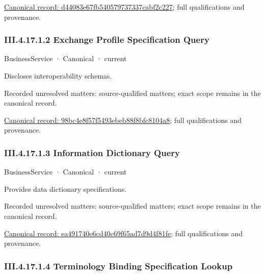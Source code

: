 {\footnotesize \href{../../../../../../../../continuum/business/business-function/d44083e67fb540579737337cabf2c227.md}{Canonical record: d44083e67fb540579737337cabf2c227}; full qualifications and provenance.}\par
\subsubsection*{III.4.17.1.2 Exchange Profile Specification Query}
\label{navigation:III.4.17.1.2}

\label{element:98bc4e8f57f5493ebeb88f8bfc8104a8}
{\small BusinessService · Canonical · current}\par

Discloses interoperability schemas.


{\small Recorded unresolved matters: source-qualified matters; exact scope remains in the canonical record.}\par
{\footnotesize \href{../../../../../../../../continuum/business/business-service/98bc4e8f57f5493ebeb88f8bfc8104a8.md}{Canonical record: 98bc4e8f57f5493ebeb88f8bfc8104a8}; full qualifications and provenance.}\par
\subsubsection*{III.4.17.1.3 Information Dictionary Query}
\label{navigation:III.4.17.1.3}

\label{element:ea491740e6cd40c69f65ad7d9d4f81fe}
{\small BusinessService · Canonical · current}\par

Provides data dictionary specifications.


{\small Recorded unresolved matters: source-qualified matters; exact scope remains in the canonical record.}\par
{\footnotesize \href{../../../../../../../../continuum/business/business-service/ea491740e6cd40c69f65ad7d9d4f81fe.md}{Canonical record: ea491740e6cd40c69f65ad7d9d4f81fe}; full qualifications and provenance.}\par
\subsubsection*{III.4.17.1.4 Terminology Binding Specification Lookup}
\label{navigation:III.4.17.1.4}

